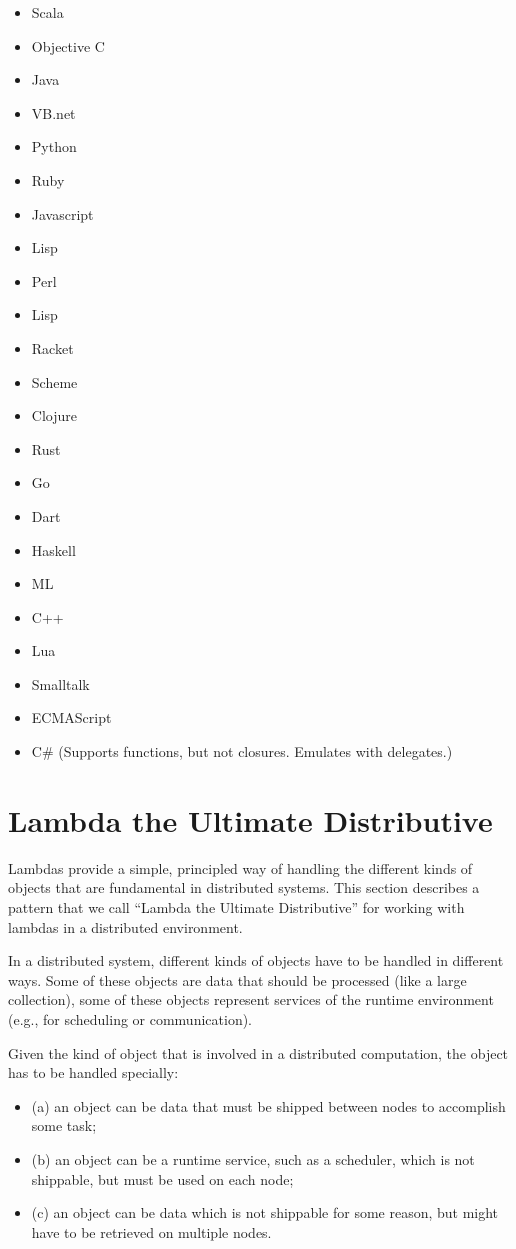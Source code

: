 \documentclass{llncs}
\begin{document}
\begin{itemize}
\item Scala
\item Objective C
\item Java
\item VB.net
\item Python
\item Ruby
\item Javascript
\item Lisp
\item Perl
\item Lisp
\item Racket
\item Scheme
\item Clojure
\item Rust
\item Go
\item Dart
\item Haskell
\item ML
\item C++
\item Lua
\item Smalltalk
\item ECMAScript
\item C\# (Supports functions, but not closures. Emulates with delegates.)
\end{itemize}

\section{Lambda the Ultimate Distributive}

Lambdas provide a simple, principled way of handling the different kinds of
objects that are fundamental in distributed systems. This section describes a
pattern that we call ``Lambda the Ultimate Distributive'' for working with
lambdas in a distributed environment.

In a distributed system, different kinds of objects have to be handled in
different ways. Some of these objects are data that should be processed (like
a large collection), some of these objects represent services of the runtime
environment (e.g., for scheduling or communication).

Given the kind of object that is involved in a distributed computation, the
object has to be handled specially:
\begin{itemize}

\item (a) an object can be data that must be shipped between nodes to accomplish
some task;

\item (b) an object can be a runtime service, such as a scheduler, which is not
shippable, but must be used on each node;

\item (c) an object can be data which is not shippable for some reason, but might
have to be retrieved on multiple nodes.

\end{itemize}
\end{document}
